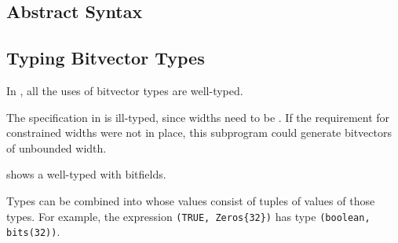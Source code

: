 \subsection{Abstract Syntax}


\begin{mathpar}
\end{mathpar}

\begin{mathpar}
\end{mathpar}

\subsection{Typing Bitvector Types}
In , all the uses of bitvector types are well-typed.

The specification in  is ill-typed, since widths need
to be \constrainedintegersterm.
If the requirement for constrained widths were not in place, this subprogram could generate
bitvectors of unbounded width.

 shows a well-typed \bitvectortypeterm{} with bitfields.



\hypertarget{tupletypeterm}{}

Types can be combined into \tupletypesterm{} whose values consist of tuples of values of those types.
For example, the expression \verb|(TRUE, Zeros{32})| has type \verb|(boolean, bits(32))|.

